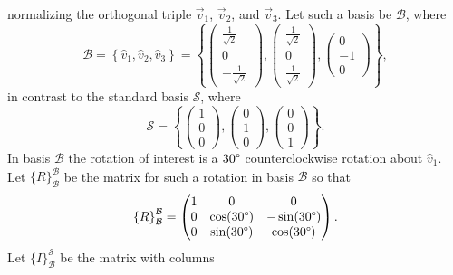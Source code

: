 \documentclass[12pt]{article}
\begin{document}
normalizing the orthogonal triple $\vec{v}_1$, $\vec{v}_2$, and $\vec{v}_3$.
Let such a basis be $\mathcal{B}$, where
\begin{equation*}
	\mathcal{B}
	=
	\left\{ \hat{v}_1, \hat{v}_2, \hat{v}_3 \right\}
	=
	\left\{
		\begin{pmatrix}
			\frac{1}{\sqrt{2}} \\
			0 \\
			-\frac{1}{\sqrt{2}}
		\end{pmatrix}
		,
		\begin{pmatrix}
			\frac{1}{\sqrt{2}} \\
			0 \\
			\frac{1}{\sqrt{2}}
		\end{pmatrix}
		,
		\begin{pmatrix}
			0 \\
			-1 \\
			0
		\end{pmatrix}
	\right\}
	,
\end{equation*}
in contrast to the standard basis $\mathcal{S}$, where
\begin{equation*}
	\mathcal{S}
	=
	\left\{
		\begin{pmatrix} 1 \\ 0 \\ 0 \end{pmatrix},
		\begin{pmatrix} 0 \\ 1 \\ 0 \end{pmatrix},
		\begin{pmatrix} 0 \\ 0 \\ 1 \end{pmatrix}
	\right\}
	.
\end{equation*}
\newpage \noindent
In basis $\mathcal{B}$ the rotation of interest is a $30 \degree$
counterclockwise rotation about $\hat{v}_1$. \\
Let ${\{R\}}_{\mathcal{B}}^{\mathcal{B}}$ be the matrix for such a rotation in
basis $\mathcal{B}$ so that
\begin{equation*}
	{\{R\}}_{\mathcal{B}}^{\mathcal{B}}
	=
	\begin{pmatrix}
		1 & 0 & 0 \\
		0 & \cos(30 \degree) & -\sin(30 \degree) \\
		0 & \sin(30 \degree) & \cos(30 \degree)
	\end{pmatrix}
	.
\end{equation*}
Let ${\{I\}}_{\mathcal{B}}^{\mathcal{S}}$ be the matrix with columns
\end{document}
